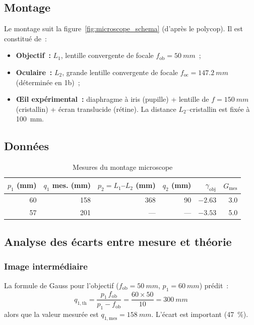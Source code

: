 ﻿\documentclass[a4paper, 11pt]{article}
\begin{document}
\subsection{Montage}

Le montage suit la figure~\ref{fig:microscope_schema} (d'après le polycop). Il est constitué de~:
\begin{itemize}
  \item \textbf{Objectif~:} $L_1$, lentille convergente de focale $f_\mathrm{ob} = \SI{50}{mm}$~;
  \item \textbf{Oculaire~:} $L_2$, grande lentille convergente de focale $f_\mathrm{oc} = \SI{147.2}{mm}$ (déterminée en 1b)~;
  \item \textbf{Œil expérimental~:} diaphragme à iris (pupille) + lentille de $f = \SI{150}{mm}$ (cristallin) + écran translucide (rétine). La distance $L_2$–cristallin est fixée à \SI{100}{mm}.
\end{itemize}

\subsection{Données}

\begin{table}[H]
\centering
\caption{Mesures du montage microscope}
\label{tab:micro}
\begin{tabular}{rrrrrr}
\toprule
$p_1$ (mm) & $q_1$ mes. (mm) & $p_2 = L_1$--$L_2$ (mm) & $q_2$ (mm) & $\gamma_\mathrm{obj}$ & $G_\mathrm{mes}$ \\
\midrule
60 & 158 & 368 & 90 & $-2.63$ & 3.0 \\
57 & 201 & --- & --- & $-3.53$ & 5.0 \\
\bottomrule
\end{tabular}
\end{table}

\subsection{Analyse des écarts entre mesure et théorie}

\subsubsection{Image intermédiaire}

La formule de Gauss pour l'objectif ($f_\mathrm{ob} = \SI{50}{mm}$, $p_1 = \SI{60}{mm}$) prédit~:
\begin{equation*}
  q_{1,\mathrm{th}} = \frac{p_1\,f_\mathrm{ob}}{p_1 - f_\mathrm{ob}} = \frac{60 \times 50}{10} = \SI{300}{mm}
\end{equation*}
alors que la valeur mesurée est $q_{1,\mathrm{mes}} = \SI{158}{mm}$. L'écart est important (\SI{47}{\percent}).
\end{document}
